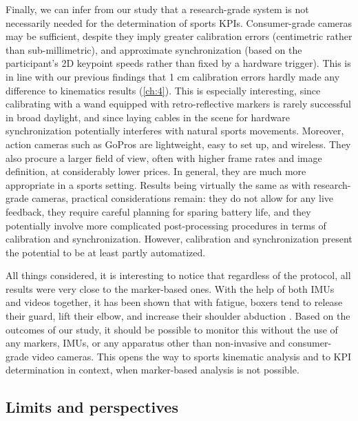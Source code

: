 Finally, we can infer from our study that a research-grade system is not necessarily needed for the determination of sports KPIs. Consumer-grade cameras may be sufficient, despite they imply greater calibration errors (centimetric rather than sub-millimetric), and approximate synchronization (based on the participant's 2D keypoint speeds rather than fixed by a hardware trigger). This is in line with our previous findings that 1 cm calibration errors hardly made any difference to kinematics results \cite{Pagnon2021} (\autoref{ch:4}). This is especially interesting, since calibrating with a wand equipped with retro-reflective markers is rarely successful in broad daylight, and since laying cables in the scene for hardware synchronization potentially interferes with natural sports movements. Moreover, action cameras such as GoPros are lightweight, easy to set up, and wireless. They also procure a larger field of view, often with higher frame rates and image definition, at considerably lower prices. In general, they are much more appropriate in a sports setting. Results being virtually the same as with research-grade cameras, practical considerations remain: they do not allow for any live feedback, they require careful planning for sparing battery life, and they potentially involve more complicated post-processing procedures in terms of calibration and synchronization. However, calibration and synchronization present the potential to be at least partly automatized.

All things considered, it is interesting to notice that regardless of the protocol, all results were very close to the marker-based ones. With the help of both IMUs and videos together, it has been shown that with fatigue, boxers tend to release their guard, lift their elbow, and increase their shoulder abduction \cite{Haralabidis2020}. Based on the outcomes of our study, it should be possible to monitor this without the use of any markers, IMUs, or any apparatus other than non-invasive and consumer-grade video cameras. This opens the way to sports kinematic analysis and to KPI determination in context, when marker-based analysis is not possible. 


\subsection{Limits and perspectives}

